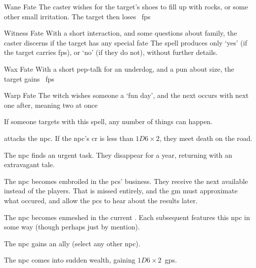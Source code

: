 \ifodd\value{diceNo}

  {}%
  {Wane}%
  {Fate}%
  {}%
  {The caster wishes for the target's shoes to fill up with rocks, or some other small irritation.
    The target then loses \showDam~\glspl{fp}}%
  {}

  {}%
  {Witness}%
  {Fate}%
  {}%
  {With a short interaction, and some questions about family, the caster discerns if the target has any special fate}%
  {The spell produces only `yes' (if the target carries \glspl{fp}), or `no' (if they do not), without further details.}

\else

  {}%
  {Wax}%
  {Fate}%
  {}%
  {With a short pep-talk for an underdog, and a pun about size, the target gains \showDam~\glspl{fp}}%
  {}

  {}%
  {Warp}%
  {Fate}%
  {}%
  {The \gls{witch} wishes someone a `fun day', and the next  occurs with next one after, meaning two  at once}%
  {
    If someone targets  with this \gls{spell}, any number of things can happen.
    \begin{dlist}
      \item
       attacks the \gls{npc}.
      If the \gls{npc}'s \gls{cr} is less than $1D6\times2$, they meet death on the road.
      \item
      The \gls{npc} finds an urgent task.
      They disappear for a year, returning with an extravagant tale.
      \item
      The \gls{npc} becomes embroiled in the \glspl{pc}' business.
      They receive the next available  instead of the players.
      That  is missed entirely, and the \gls{gm} must approximate what occured, and allow the \glspl{pc} to hear about the results later.
      \item
      The \gls{npc} becomes enmeshed in the current .
      Each subsequent  features this \gls{npc} in some way (though perhaps just by mention).
      \item
      The \gls{npc} gains an ally (select any other \gls{npc}).
      \item
      The \gls{npc} comes into sudden wealth, gaining $1D6 \times 2$~\glspl{gp}.
    \end{dlist}
  }

\fi
{}

